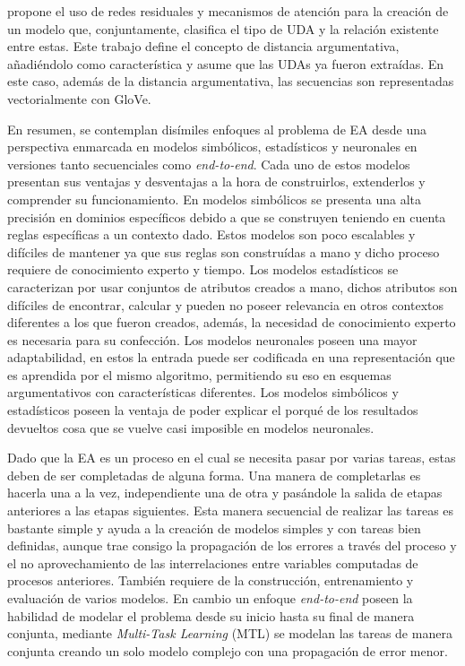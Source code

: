 \textcite{galassi2021deep} propone el uso de redes residuales y mecanismos de atención
para la creación de un modelo que, conjuntamente, clasifica el tipo de UDA y la relación existente entre estas.
Este trabajo define el concepto de distancia argumentativa, añadiéndolo como característica y asume que las UDAs ya fueron 
extraídas. En este caso, además de la distancia argumentativa, las secuencias son representadas 
vectorialmente con GloVe.

En resumen, se contemplan disímiles enfoques al problema de EA desde una perspectiva enmarcada en modelos 
simbólicos, estadísticos y neuronales en versiones tanto secuenciales como \emph{end-to-end}. 
Cada uno de estos modelos presentan sus ventajas y desventajas a la hora de construirlos, 
extenderlos y comprender su funcionamiento. En modelos simbólicos se presenta una alta
precisión en dominios específicos debido a que se construyen teniendo en cuenta reglas específicas a un
contexto dado. Estos modelos son poco escalables y difíciles de mantener ya que sus reglas son construídas
a mano y dicho proceso requiere de conocimiento experto y tiempo. Los modelos estadísticos 
se caracterizan por usar conjuntos de atributos creados a mano, dichos atributos son difíciles
de encontrar, calcular y pueden no poseer relevancia en otros contextos diferentes a los que fueron creados,
además, la necesidad de conocimiento experto es necesaria para su confección. Los modelos neuronales poseen
una mayor adaptabilidad, en estos la entrada puede ser codificada en una representación que es aprendida por
el mismo algoritmo, permitiendo su eso en esquemas argumentativos con características diferentes. Los modelos simbólicos y 
estadísticos poseen la ventaja de poder explicar el porqué de los resultados devueltos cosa que se vuelve casi
imposible en modelos neuronales.

Dado que la EA es un proceso en el cual se necesita pasar por varias tareas, estas deben de ser completadas
de alguna forma. Una manera de completarlas es hacerla una a la vez, independiente una de otra y pasándole
la salida de etapas anteriores a las etapas siguientes. Esta manera secuencial de realizar las 
tareas es bastante simple y ayuda a la creación de modelos simples y con tareas bien definidas, aunque trae consigo 
la propagación de los errores a través del proceso y el no aprovechamiento de las interrelaciones entre variables 
computadas de procesos anteriores. También requiere de la construcción, entrenamiento y evaluación de varios modelos.
En cambio un enfoque \emph{end-to-end} poseen la habilidad de modelar el problema 
desde su inicio hasta su final de manera conjunta, mediante \emph{Multi-Task Learning} (MTL) se modelan
las tareas de manera conjunta creando un solo modelo complejo con una propagación de error menor.

